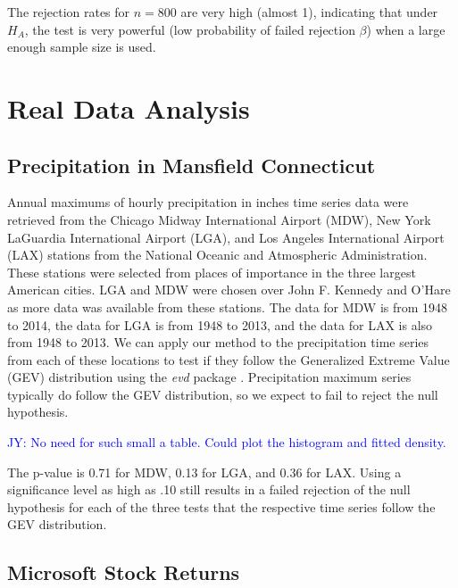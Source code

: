 \documentclass[12pt, titlepage, letterpaper]{article}
\newcommand{\jy}[1]{\textcolor{blue}{JY: #1}}
\newcommand{\mc}[1]{\textcolor{green}{MC: (#1)}}
\begin{document}
{The rejection rates for $n = 800$
are very 
high (almost 1), indicating that under $H_A$, the test is very powerful 
(low probability of failed rejection $\beta$) when a large enough
sample size is used.


\section{Real Data Analysis}
\label{sec:real}

\subsection{Precipitation in Mansfield Connecticut}
\label{sec:precipitation}
Annual maximums of hourly precipitation in inches time series data were 
retrieved 
from the Chicago Midway International Airport (MDW), New York LaGuardia 
International 
Airport (LGA),
and Los Angeles International Airport (LAX) stations from the 
National Oceanic and Atmospheric Administration. These stations were selected 
from places of importance in the three largest American cities. LGA and
MDW were chosen over John F. Kennedy and O'Hare as more data was available
from these stations. The data for MDW is from
1948 to 2014, the data for LGA is from 1948 to 2013, and the
data for LAX is also from 1948 to 2013. We can apply our method to
the precipitation time series from each of these locations to test if they
follow the
Generalized Extreme Value (GEV) distribution using the \textsl{evd} 
package \citep{evd}. Precipitation maximum series 
typically do follow the GEV distribution, so we expect to fail to reject the
null hypothesis.

\jy{No need for such small a table. Could plot the histogram and fitted density.}

%

The p-value is 0.71 for MDW, 0.13 for LGA, and 0.36 for LAX. Using a 
significance level as 
high as .10 still results in a failed rejection
of the null hypothesis for each of the three tests that the respective 
time series follow the GEV distribution.

\subsection{Microsoft Stock Returns}
\label{sec:microsoft}


}
\end{document}
